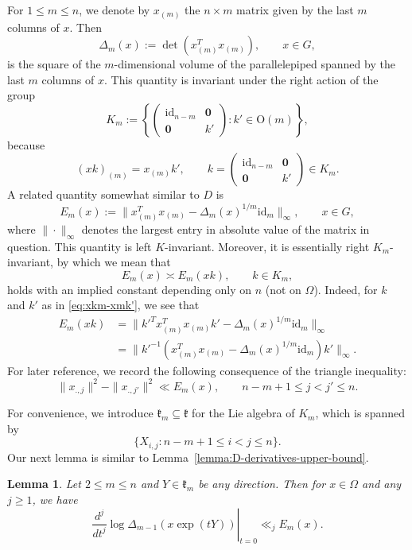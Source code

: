\documentclass[11pt,oneside]{amsart}
\numberwithin{equation}{section}
\theoremstyle{remark}
\theoremstyle{plain}
\newtheorem{lemma}{Lemma}
\newcommand\OO{\mathrm{O}}
\newcommand\id{\mathrm{id}}
\newcommand\mfk{\mathfrak{k}}
\renewcommand\leq{\leqslant}
\renewcommand\geq{\geqslant}
\begin{document}
For $1\leq m\leq n$, we denote by $x_{(m)}$ the $n\times m$ matrix given by the last $m$ columns of $x$. Then 
\begin{equation}\label{deltam}
\Delta_m(x):= \det \left(x_{(m)}^T x_{(m)}\right), \qquad x\in G,
\end{equation}
is the square of the $m$-dimensional volume of the parallelepiped spanned by the last $m$ columns of $x$. This quantity is invariant under the right action of the group
\[
K_{m}:=\left\{\begin{pmatrix} \id_{n-m} & \mathbf{0} \\ \mathbf{0} & k' \end{pmatrix}:k'\in\OO(m)\right\},
\]
because
\begin{equation}\label{eq:xkm-xmk'}
(x k)_{(m)} = x_{(m)}k',\qquad k = \begin{pmatrix} \id_{n-m} & \mathbf{0} \\ \mathbf{0} & k' \end{pmatrix}\in K_m.
\end{equation}
A related quantity somewhat similar to $D$ is
\begin{equation}\label{eq:Em-def}
E_{m}(x):= \bigl\|x_{(m)}^T x_{(m)} - \Delta_m(x)^{1/m} \id_m\bigr\|_{\infty},\qquad x\in G,
\end{equation}
where $\| \cdot \|_{\infty}$ denotes the largest entry in absolute value of the matrix in question. This quantity is left $K$-invariant. Moreover, it is essentially right $K_m$-invariant, by which we mean that
\begin{equation}\label{eq:E_m-K_m-invariance}
E_{m}(x)\asymp E_{m}(xk),\qquad k\in K_{m},
\end{equation}
holds with an implied constant depending only on $n$ (not on $\Omega$). 
Indeed, for $k$ and $k'$ as in \eqref{eq:xkm-xmk'}, we see that
\begin{align*}
E_{m}(xk) & = \bigl\| k'^Tx_{(m)}^T x_{(m)}k' - \Delta_m(x)^{1/m} \id_m \bigr\|_{\infty} \\ & = \bigl\| k'^{-1} ( x_{(m)}^T x_{(m)} - \Delta_m(x)^{1/m} \id_m) k' \bigr\|_{\infty} .
\end{align*}
For later reference, we record the following consequence of the triangle inequality:
\begin{equation}\label{eq:E_m-related-to-column-lengths}
\|x_{.,j}\|^2 - \|x_{.,j'}\|^2 \ll E_m(x),\qquad n-m+1 \leq j < j' \leq n.
\end{equation}

For convenience, we introduce $\mfk_{m}\subseteq \mfk$ for the Lie algebra of $K_{m}$, which is spanned by
\[
\{X_{i,j}:n-m+1\leq i<j\leq n\}.
\]
Our next lemma is similar to Lemma~\ref{lemma:D-derivatives-upper-bound}.
\begin{lemma}\label{lemma:E-m-derivatives-upper-bound} Let $2\leq m \leq n$ and $Y\in\mfk_{m}$ be any direction. Then for $x\in\Omega$ and any $j\geq 1$, we have
\[
\left.\frac{d^j}{dt^j} \log \Delta_{m-1}(x\exp(tY))\right|_{t=0} \ll_{j} E_{m}(x).
\]
\end{lemma}
\end{document}
